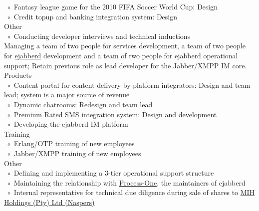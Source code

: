 \documentclass[10pt,a4paper,final]{columncv}
\newcommand{\cvitembullet}{~$\circ$~}
\newcommand{\cvitempbullet}{\phantom{\cvitembullet}}
\begin{document}
\begin{cvenv}
{          \cvitembullet Fantasy league game for the 2010 FIFA Soccer World Cup: Design \\
          \cvitembullet Credit topup and banking integration system: Design \\
          Other \\
          \cvitembullet Conducting developer interviews and technical inductions \\}
         {Managing a team of two people for services development, a team of two people for 
          \href{http://www.process-one.net/en/ejabberd/}{ejabberd} development and a team 
          of two people for ejabberd operational support; 
          Retain previous role as lead developer for the Jabber/XMPP IM core.}
          {Products \\
           \cvitembullet Content portal for content delivery by platform integrators: 
           \cvitempbullet Design and team lead; system is a major source of revenue \\ 
           \cvitembullet Dynamic chatrooms: Redesign and team lead \\
           \cvitembullet Premium Rated SMS integration system: Design and development \\
           \cvitembullet Developing the ejabberd IM platform \\
           Training \\
           \cvitembullet Erlang/OTP training of new employees \\
           \cvitembullet Jabber/XMPP training of new employees \\
           Other \\
           \cvitembullet Defining and implementing a 3-tier operational support structure \\
           \cvitembullet Maintaining the relationship with 
                    \href{http://www.process-one.net/en/}{Process-One}, the maintainers  
           \cvitempbullet of ejabberd \\
           \cvitembullet Internal representative for technical due diligence during sale of 
           \cvitempbullet shares to \href{http://www.naspers.com/}{MIH Holdings (Pty) Ltd (Naspers)} \\}


\end{cvenv}
\end{document}

